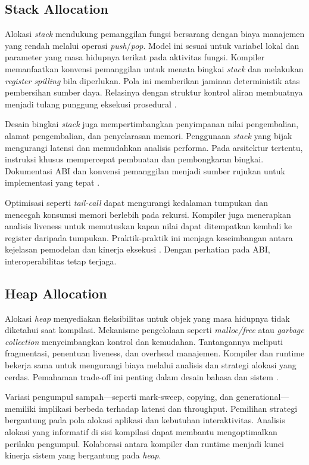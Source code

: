 \documentclass[../main.tex]{subfiles}
\begin{document}
\subsection{Stack Allocation}
Alokasi \emph{stack} mendukung pemanggilan fungsi bersarang dengan biaya manajemen yang rendah melalui operasi \emph{push}/\emph{pop}. Model ini sesuai untuk variabel lokal dan parameter yang masa hidupnya terikat pada aktivitas fungsi. Kompiler memanfaatkan konvensi pemanggilan untuk menata bingkai \emph{stack} dan melakukan \emph{register spilling} bila diperlukan. Pola ini memberikan jaminan deterministik atas pembersihan sumber daya. Relasinya dengan struktur kontrol aliran membuatnya menjadi tulang punggung eksekusi prosedural \citep{WikiCallStack}.

Desain bingkai \emph{stack} juga mempertimbangkan penyimpanan nilai pengembalian, alamat pengembalian, dan penyelarasan memori. Penggunaan \emph{stack} yang bijak mengurangi latensi dan memudahkan analisis performa. Pada arsitektur tertentu, instruksi khusus mempercepat pembuatan dan pembongkaran bingkai. Dokumentasi ABI dan konvensi pemanggilan menjadi sumber rujukan untuk implementasi yang tepat \citep{WikiCallStack}.

Optimisasi seperti \emph{tail-call} dapat mengurangi kedalaman tumpukan dan mencegah konsumsi memori berlebih pada rekursi. Kompiler juga menerapkan analisis liveness untuk memutuskan kapan nilai dapat ditempatkan kembali ke register daripada tumpukan. Praktik-praktik ini menjaga keseimbangan antara kejelasan pemodelan dan kinerja eksekusi \citep{WikiCallStack}. Dengan perhatian pada ABI, interoperabilitas tetap terjaga.

\subsection{Heap Allocation}
Alokasi \emph{heap} menyediakan fleksibilitas untuk objek yang masa hidupnya tidak diketahui saat kompilasi. Mekanisme pengelolaan seperti \emph{malloc/free} atau \emph{garbage collection} menyeimbangkan kontrol dan kemudahan. Tantangannya meliputi fragmentasi, penentuan liveness, dan overhead manajemen. Kompiler dan runtime bekerja sama untuk mengurangi biaya melalui analisis dan strategi alokasi yang cerdas. Pemahaman trade-off ini penting dalam desain bahasa dan sistem \citep{WikiMemory}.

Variasi pengumpul sampah—seperti mark-sweep, copying, dan generational—memiliki implikasi berbeda terhadap latensi dan throughput. Pemilihan strategi bergantung pada pola alokasi aplikasi dan kebutuhan interaktivitas. Analisis alokasi yang informatif di sisi kompilasi dapat membantu mengoptimalkan perilaku pengumpul. Kolaborasi antara kompiler dan runtime menjadi kunci kinerja sistem yang bergantung pada \emph{heap}.
\end{document}
